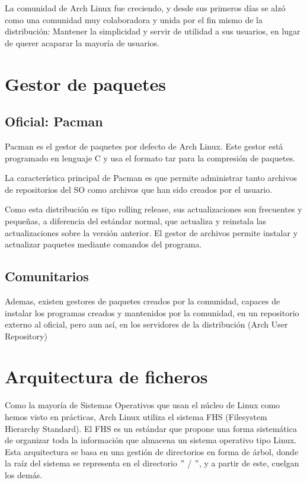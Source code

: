 \documentclass[12pt, spanish]{article}
\begin{document}
La comunidad de Arch Linux fue creciendo, y desde sus primeros días se alzó como una comunidad muy colaboradora y unida por el fin mismo de la distribución: Mantener la simplicidad y servir de utilidad a sus usuarios, en lugar de querer acaparar la mayoría de usuarios.

\newpage

\section{Gestor de paquetes}

\subsection{Oficial: Pacman}

Pacman es el gestor de paquetes por defecto de Arch Linux. Este gestor está programado en lenguaje C y usa el formato tar para la compresión de paquetes.

La característica principal de Pacman es que permite administrar tanto archivos de repositorios del SO como archivos que han sido creados por el usuario. 

Como esta distribución es tipo rolling release, sus actualizaciones son frecuentes y pequeñas, a diferencia del estándar normal, que actualiza y reinstala las actualizaciones sobre la versión anterior. El gestor de archivos permite instalar y actualizar paquetes mediante comandos del programa.

\subsection{Comunitarios}

Ademas, existen gestores de paquetes creados por la comunidad, capaces de instalar los programas creados y mantenidos por la comunidad, en un repositorio externo al oficial, pero aun así, en los servidores de la distribución (Arch User Repository)

\newpage

\section{Arquitectura de ficheros}

Como la mayoría de Sistemas Operativos que usan el núcleo de Linux como hemos visto en prácticas, Arch Linux utiliza el sistema FHS (Filesystem Hierarchy Standard). El FHS es un estándar que propone una forma sistemática de organizar toda la información que almacena un sistema operativo tipo Linux. Esta arquitectura se basa en una gestión de directorios en forma de árbol, donde la raíz del sistema se representa en el directorio $"$ / $"$, y a partir de este, cuelgan los demás.
\end{document}
